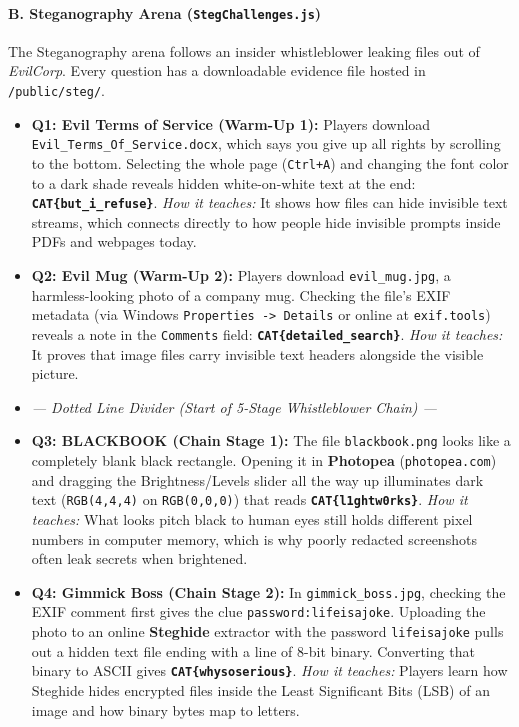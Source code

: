 \documentclass[11pt,a4paper]{article}
\begin{document}
\paragraph{B. Steganography Arena (\texttt{StegChallenges.js})}
The Steganography arena follows an insider whistleblower leaking files out of \textit{EvilCorp}. Every question has a downloadable evidence file hosted in \texttt{/public/steg/}.
\begin{itemize}
    \item \textbf{Q1: Evil Terms of Service (Warm-Up 1):} Players download \texttt{Evil\_Terms\_\allowbreak Of\_Service.docx}, which says you give up all rights by scrolling to the bottom. Selecting the whole page (\texttt{Ctrl+A}) and changing the font color to a dark shade reveals hidden white-on-white text at the end: \textbf{\texttt{CAT\{but\_i\_refuse\}}}. \textit{How it teaches:} It shows how files can hide invisible text streams, which connects directly to how people hide invisible prompts inside PDFs and webpages today.
    \item \textbf{Q2: Evil Mug (Warm-Up 2):} Players download \texttt{evil\_mug.jpg}, a harmless-looking photo of a company mug. Checking the file's EXIF metadata (via Windows \texttt{Properties -> Details} or online at \texttt{exif.tools}) reveals a note in the \texttt{Comments} field: \textbf{\texttt{CAT\{detailed\_\allowbreak search\}}}. \textit{How it teaches:} It proves that image files carry invisible text headers alongside the visible picture.
    \item \textit{--- Dotted Line Divider (Start of 5-Stage Whistleblower Chain) ---}
    \item \textbf{Q3: BLACKBOOK (Chain Stage 1):} The file \texttt{blackbook.png} looks like a completely blank black rectangle. Opening it in \textbf{Photopea} (\texttt{photopea.com}) and dragging the Brightness/Levels slider all the way up illuminates dark text (\texttt{RGB(4,4,4)} on \texttt{RGB(0,0,0)}) that reads \textbf{\texttt{CAT\{l1ghtw0rks\}}}. \textit{How it teaches:} What looks pitch black to human eyes still holds different pixel numbers in computer memory, which is why poorly redacted screenshots often leak secrets when brightened.
    \item \textbf{Q4: Gimmick Boss (Chain Stage 2):} In \texttt{gimmick\_boss.jpg}, checking the EXIF comment first gives the clue \texttt{password:lifeisajoke}. Uploading the photo to an online \textbf{Steghide} extractor with the password \texttt{lifeisajoke} pulls out a hidden text file ending with a line of 8-bit binary. Converting that binary to ASCII gives \textbf{\texttt{CAT\{whysoserious\}}}. \textit{How it teaches:} Players learn how Steghide hides encrypted files inside the Least Significant Bits (LSB) of an image and how binary bytes map to letters.

\end{itemize}
\end{document}
